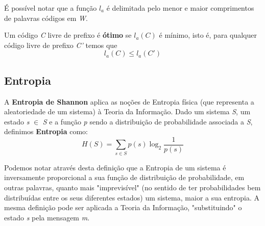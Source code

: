 É possível notar que a função $l_a$ é delimitada pelo menor e maior comprimentos de palavras códigos em \emph{W}.  

Um código \emph{C} livre de prefixo é \textbf{ótimo} se $l_a(C)$ é mínimo, isto é, para qualquer código livre de prefixo \emph{C'} temos que
\begin{equation}
l_a(C) \leq l_a(C')
\end{equation}

\subsection{Entropia}
A \textbf{Entropia de Shannon} aplica as noções de Entropia física (que representa a aleatoriedade de um sistema) à Teoria da Informação. Dado um sistema \emph{S}, um estado \emph{s} $\in$ \emph{S} e a função \emph{p} sendo a distribuição de probabilidade associada a \emph{S}, definimos \textbf{Entropia} como:
\begin{equation}
H(S) = \sum_{s \in S}^{} p(s) \log_2 \frac{1}{p(s)}
\end{equation}

Podemos notar através desta definição que a Entropia de um sistema é inversamente proporcional a sua função de distribuição de probabilidade, em outras palavras, quanto mais "imprevisível" (no sentido de ter probabilidades bem distribuídas entre os seus diferentes estados) um sistema, maior a sua entropia.
A mesma definição pode ser aplicada a Teoria da Informação, "substituindo" o estado \emph{s} pela mensagem \emph{m}.




